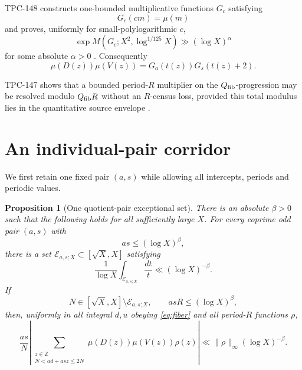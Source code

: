 \documentclass[11pt]{article}
\newtheorem{proposition}[theorem]{Proposition}
\theoremstyle{definition}
\theoremstyle{remark}
\begin{document}
TPC-148 constructs one-bounded multiplicative functions \(G_c\)
satisfying
\begin{equation}
 G_c(cm)=\mu(m)
\label{eq:quotient}
\end{equation}
and proves, uniformly for small-polylogarithmic \(c\),
\begin{equation}
 \exp M(G_c;X^2,\log^{1/125}X)
 \gg(\log X)^\alpha
\label{eq:nonpret}
\end{equation}
for some absolute \(\alpha>0\)
\citep{WangTPC148,MatomakiRadziwillTao2015}.  Consequently
\begin{equation}
 \mu(D(z))\mu(V(z))=G_a(t(z))G_s(t(z)+2).
\label{eq:core}
\end{equation}

TPC-147 shows that a bounded period-\(R\) multiplier on the
\(Q_{\rm fib}\)-progression may be resolved modulo
\(Q_{\rm fib}R\) without an \(R\)-census loss, provided this total
modulus lies in the quantitative source envelope
\citep{WangTPC147}.

\section{An individual-pair corridor}

We first retain one fixed pair \((a,s)\) while allowing all
intercepts, periods and periodic values.

\begin{proposition}[One quotient-pair exceptional set]
\label{prop:pair}
There is an absolute \(\beta>0\) such that the following holds for
all sufficiently large \(X\).  For every coprime odd pair \((a,s)\)
with
\[
 as\le(\log X)^\beta,
\]
there is a set
\(\mathcal E_{a,s;X}\subset[\sqrt X,X]\) satisfying
\begin{equation}
 \frac1{\log X}\int_{\mathcal E_{a,s;X}}\frac{dt}{t}
 \ll(\log X)^{-\beta}.
\label{eq:pair-exception}
\end{equation}
If
\[
 N\in[\sqrt X,X]\setminus\mathcal E_{a,s;X},
 \qquad asR\le(\log X)^\beta,
\]
then, uniformly in all integral \(d,u\) obeying \eqref{eq:fiber}
and all period-\(R\) functions \(\rho\),
\begin{equation}
 \frac{as}{N}
 \left|
 \sum_{\substack{z\in\mathbb Z\\N<ad+asz\le2N}}
 \mu(D(z))\mu(V(z))\rho(z)
 \right|
 \ll\|\rho\|_\infty(\log X)^{-\beta}.
\label{eq:pair-bound}
\end{equation}
\end{proposition}
\end{document}
